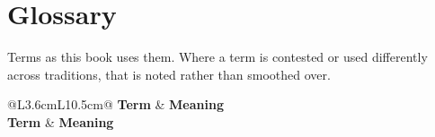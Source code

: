\chapter{Glossary}\label{app:glossary}

Terms as this book uses them. Where a term is contested or used differently
across traditions, that is noted rather than smoothed over.

\begin{center}
\small
\begin{longtable}{@{}L{3.6cm}L{10.5cm}@{}}
\toprule
\textbf{Term} & \textbf{Meaning} \\
\midrule
\endfirsthead
\toprule
\textbf{Term} & \textbf{Meaning} \\
\midrule
\endhead
\bottomrule
\endfoot


\end{longtable}
\end{center}
